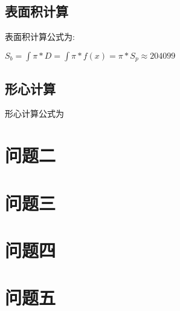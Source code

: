 \documentclass[UTF8]{ctexart}
\begin{document}
			\subsection{表面积计算}
				\begin{flushleft}
					表面积计算公式为:
				\end{flushleft}
				\begin{center}
					$S_b=\int \pi*D =\int \pi*f(x)=\pi*S_p\approx204099$
				\end{center}
			\subsection{形心计算}
				\begin{flushleft}
					形心计算公式为
				\end{flushleft}
		\section{问题二}
		\section{问题三}
		\section{问题四}
		\section{问题五}
\end{document}
